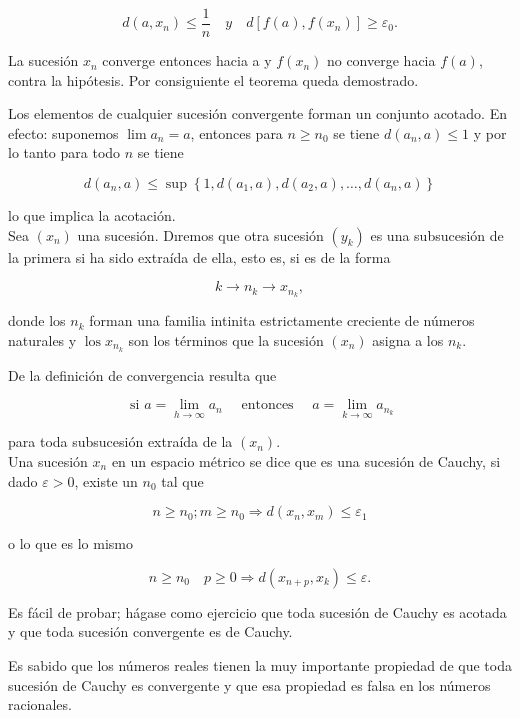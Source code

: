 \documentclass[10pt]{article}
\theoremstyle{plain}
\theoremstyle{definition}
\theoremstyle{remark}
\begin{document}
$$
d\left(a, x_{n}\right) \leqslant \frac{1}{n} \quad y \quad d\left[f(a), f\left(x_{n}\right)\right] \geqslant \varepsilon_{0} .
$$

La sucesión $x_{n}$ converge entonces hacia a y $f\left(x_{n}\right)$ no converge hacia $f(a)$, contra la hipótesis. Por consiguiente el teorema queda demostrado.

Los elementos de cualquier sucesión convergente forman un conjunto acotado. En efecto: suponemos $\lim a_{n}=a$, entonces para $n \geqslant n_{0}$ se tiene $d\left(a_{n}, a\right) \leqslant 1$ y por lo tanto para todo $n$ se tiene

$$
d\left(a_{n}, a\right) \leqslant \sup \left\{1, d\left(a_{1}, a\right), d\left(a_{2}, a\right), \ldots, d\left(a_{n}, a\right)\right\}
$$

lo que implica la acotación.\\
Sea $\left(x_{n}\right)$ una sucesión. Dıremos que otra sucesión $\left(y_{k}\right)$ es una subsucesión de la primera si ha sido extraída de ella, esto es, si es de la forma

$$
k \rightarrow n_{k} \rightarrow x_{n_{k}},
$$

donde los $n_{k}$ forman una familia intinita estrictamente creciente de números naturales y $\operatorname{los} x_{n_{k}}$ son los términos que la sucesión $\left(x_{n}\right)$ asigna a los $n_{k}$.

De la definición de convergencia resulta que

$$
\text { si } a=\lim _{h \rightarrow \infty} a_{n} \quad \text { entonces } \quad a=\lim _{k \rightarrow \infty} a_{n_{k}}
$$

para toda subsucesión extraída de la $\left(x_{n}\right)$.\\
Una sucesión $x_{n}$ en un espacio métrico se dice que es una sucesión de Cauchy, si dado $\varepsilon>0$, existe un $n_{0}$ tal que

$$
n \geqslant n_{0} ; m \geqslant n_{0} \Rightarrow d\left(x_{n}, x_{m}\right) \leqslant \varepsilon_{1}
$$

o lo que es lo mismo


$$
n \geqslant n_{0} \quad p \geqslant 0 \Rightarrow d\left(x_{n+p}, x_{k}\right) \leqslant \varepsilon .
$$

Es fácil de probar; hágase como ejercicio que toda sucesión de Cauchy es acotada y que toda sucesión convergente es de Cauchy.

Es sabido que los números reales tienen la muy importante propiedad de que toda sucesión de Cauchy es convergente y que esa propiedad es falsa en los números racionales.
\end{document}
